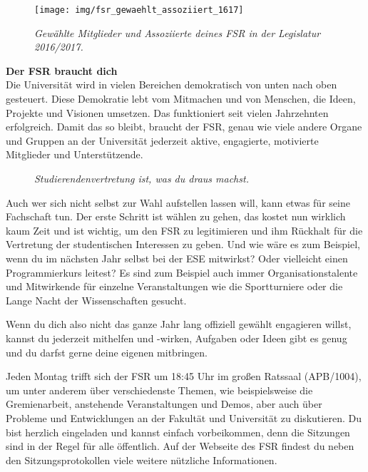 \newpage

\begin{figure}[h!]
\centering
\texttt{[image: img/fsr\_gewaehlt\_assoziiert\_1617]}
\caption*{\small \textit{Gewählte Mitglieder und Assoziierte deines FSR in der Legislatur 2016/2017.}}
\end{figure}

\textbf{Der FSR braucht dich} \\
Die Universität wird in vielen Bereichen demokratisch von unten nach oben gesteuert. Diese Demokratie lebt vom Mitmachen und von Menschen, die Ideen, Projekte und Visionen umsetzen.
Das funktioniert seit vielen Jahrzehnten erfolgreich.
Damit das so bleibt, braucht der FSR, genau wie viele andere Organe und Gruppen an der Universität jederzeit aktive, engagierte, motivierte Mitglieder und Unterstützende.

\begin{figure}[h!]
\centering
\textit{Studierendenvertretung ist, was du draus machst.}
\end{figure}

Auch wer sich nicht selbst zur Wahl aufstellen lassen will, kann etwas für seine Fachschaft tun.
Der erste Schritt ist wählen zu gehen, das kostet nun wirklich kaum Zeit und ist wichtig, um den FSR zu legitimieren und ihm Rückhalt für die Vertretung der studentischen Interessen zu geben.
Und wie wäre es zum Beispiel, wenn du im nächsten Jahr selbst bei der ESE mitwirkst? Oder vielleicht einen Programmierkurs leitest?
Es sind zum Beispiel auch immer Organisationstalente und Mitwirkende für einzelne Veranstaltungen wie die Sportturniere oder die Lange Nacht der Wissenschaften gesucht.

Wenn du dich also nicht das ganze Jahr lang offiziell gewählt engagieren willst, kannst du jederzeit mithelfen und -wirken, Aufgaben oder Ideen gibt es genug und du darfst gerne deine eigenen mitbringen. 

Jeden Montag trifft sich der FSR um 18:45 Uhr im großen Ratssaal (APB/1004), um unter anderem über verschiedenste Themen, wie beispielsweise die Gremienarbeit, anstehende Veranstaltungen und Demos, aber auch über Probleme und Entwicklungen an der Fakultät und Universität zu diskutieren.
Du bist herzlich eingeladen und kannst einfach vorbeikommen, denn die Sitzungen sind in der Regel für alle öffentlich. Auf der Webseite des FSR  findest du neben den Sitzungsprotokollen  viele weitere nützliche Informationen.

